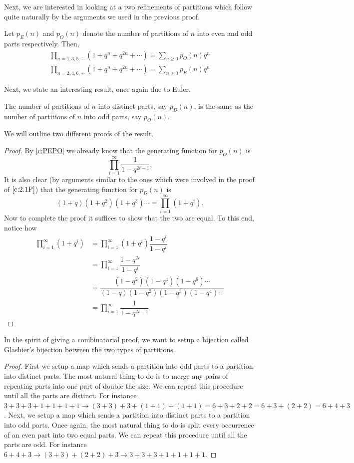 Next, we are interested in looking at a two refinements of partitions which follow quite naturally by the arguments we used in the previous proof.
\begin{claim}
    Let $p_E(n)$ and $p_O(n)$ denote the number of partitions of $n$ into even and odd parts respectively. Then,
    \begin{align*}
    \prod_{n=1,3,5,\cdots}(1+q^n+q^{2n}+\cdots)=\sum_{n\geq 0}p_O(n)q^n \\
    \prod_{n=2,4,6,\cdots}(1+q^n+q^{2n}+\cdots)=\sum_{n\geq 0}p_E(n)q^n 
    \end{align*}
    \label{c:PEPO}
\end{claim}
Next, we state an interesting result, once again due to Euler.
\begin{theorem}
The number of partitions of $n$ into distinct parts, say $p_D(n)$, is the same as the number of partitions of $n$ into odd parts, say $p_O(n)$.
\label{t:Euler'sGem}
\end{theorem}
We will outline two different proofs of the result.
\begin{proof}
By \cref{c:PEPO} we already know that the generating function for $p_O(n)$ is 
\[
\prod_{i=1}^{\infty}\dfrac{1}{1-q^{2i-1}}.
\]
It is also clear (by arguments similar to the ones which were involved in the proof of $\cref{c:2.1P}$) that the generating function for $p_D(n)$ is 
\[
(1+q)(1+q^2)(1+q^3)\cdots = \prod_{i=1}^\infty(1+q^i).
\]
Now to complete the proof it suffices to show that the two are equal. To this end, notice how 
\begin{align*}
    \prod_{i=1}^\infty(1+q^i) &= \prod_{i=1}^\infty (1+q^i)\dfrac{1-q^i}{1-q^i} \\
    &= \prod_{i=1}^\infty \dfrac{1-q^{2i}}{1-q^i} \\\
    &= \dfrac{(1-q^2)(1-q^4)(1-q^6)\cdots}{(1-q)(1-q^2)(1-q^3)(1-q^4)\cdots} \\
    &= \prod_{i=1}^\infty \dfrac{1}{1-q^{2i-1}}
\end{align*}
\end{proof}
In the spirit of giving a combinatorial proof, we want to setup a bijection called Glashier's bijection between the two types of partitions.
\begin{proof}
First we setup a map which sends a partition into odd parts to a partition into distinct parts. The most natural thing to do is to merge any pairs of repeating parts into one part of double the size. We can repeat this procedure until all the parts are distinct. For instance $3+3+3+1+1+1+1\to (3+3)+3+(1+1)+(1+1)= 6+3+2+2 = 6+3+(2+2) = 6+4+3$. Next, we setup a map which sends a partition into distinct parts to a partition into odd parts. Once again, the most natural thing to do is split every occurrence of an even part into two equal parts. We can repeat this procedure until all the parts are odd. For instance $6+4+3\to (3+3)+(2+2)+3\to 3+3+3+1+1+1+1$.
\end{proof}
